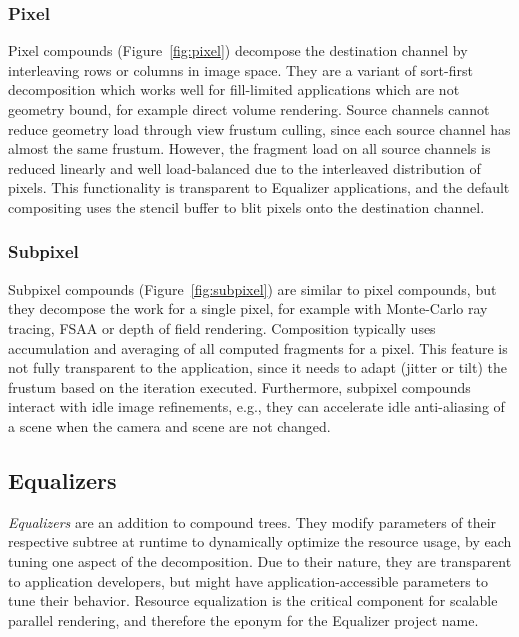 \documentclass[10pt,journal,compsoc]{IEEEtran}
\newcommand{\fig}[1]{Figure~\ref{#1}}
\begin{document}
\subsubsection{Pixel}

Pixel compounds (\fig{fig:pixel}) decompose the destination channel by
interleaving rows or columns in image space. They are a variant of sort-first
decomposition which works well for fill-limited applications which are not
geometry bound, for example direct volume rendering. Source channels cannot
reduce geometry load through view frustum culling, since each source channel has
almost the same frustum. However, the fragment load on all source channels is
reduced linearly and well load-balanced due to the interleaved distribution of
pixels. This functionality is transparent to \textsf{Equalizer} applications,
and the default compositing uses the stencil buffer to blit pixels onto the
destination channel.

\subsubsection{Subpixel}

Subpixel compounds (\fig{fig:subpixel}) are similar to pixel compounds, but they
decompose the work for a single pixel, for example with Monte-Carlo ray tracing,
FSAA or depth of field rendering. Composition typically uses accumulation and
averaging of all computed fragments for a pixel. This feature is not fully
transparent to the application, since it needs to adapt (jitter or tilt) the
frustum based on the iteration executed. Furthermore, subpixel compounds
interact with idle image refinements, e.g., they can accelerate idle
anti-aliasing of a scene when the camera and scene are not changed.

\subsection{Equalizers}

{\em Equalizers} are an addition to compound trees. They modify parameters of
their respective subtree at runtime to dynamically optimize the resource usage,
by each tuning one aspect of the decomposition. Due to their nature, they are
transparent to application developers, but might have application-accessible
parameters to tune their behavior. Resource equalization is the critical
component for scalable parallel rendering, and therefore the eponym for the
\textsf{Equalizer} project name.
\end{document}
